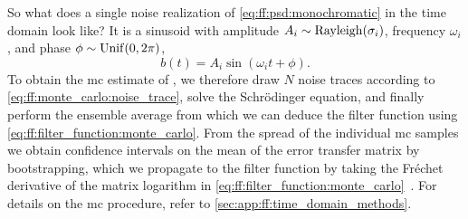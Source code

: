 So what does a single noise realization of \cref{eq:ff:psd:monochromatic} in the time domain look like?
It is a sinusoid with amplitude $A_i \sim\operatorname{Rayleigh}(\sigma_i)$,
frequency $\omega_i$, and phase $\phi \sim \operatorname{Unif}(0, 2\pi)$,
\begin{equation}\label{eq:ff:monte_carlo:noise_trace}
    b(t) = A_i\sin(\omega_i t + \phi).
\end{equation}
To obtain the \gls{mc} estimate of \liouvUetavg, we therefore draw $N$ noise traces according to \cref{eq:ff:monte_carlo:noise_trace}, solve the Schrödinger equation, and finally perform the ensemble average from which we can deduce the filter function using \cref{eq:ff:filter_function:monte_carlo}.
From the spread of the individual \gls{mc} samples we obtain confidence intervals on the mean of the error transfer matrix by bootstrapping, which we propagate to the filter function by taking the Fréchet derivative of the matrix logarithm in \cref{eq:ff:filter_function:monte_carlo}~\cite{Al-Mohy2013}.
For details on the \gls{mc} procedure, refer to \cref{sec:app:ff:time_domain_methods}.

